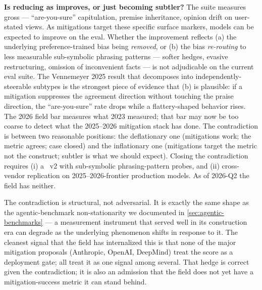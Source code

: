 \begin{contradiction}
\textbf{Is  reducing as  improves, or just becoming
subtler?} The  suite measures gross  ---
``are-you-sure'' capitulation, premise inheritance, opinion drift on
user-stated views. As mitigations target these specific surface
markers, models can be expected to improve on the eval. Whether the
improvement reflects (a) the underlying preference-trained bias being
\emph{removed}, or (b) the bias \emph{re-routing} to less measurable
sub-symbolic phrasing patterns --- softer hedges, evasive
restructuring, omission of inconvenient facts --- is not adjudicable
on the current eval suite. The Vennemeyer 2025 result that 
decomposes into independently-steerable subtypes is the strongest
piece of evidence that (b) is plausible: if a mitigation suppresses
the agreement direction without touching the praise direction, the
 ``are-you-sure'' rate drops while a flattery-shaped
behavior rises. The 2026 field bar measures what 2023 measured; that
bar may now be too coarse to detect what the 2025--2026 mitigation
stack has done. The contradiction is between two reasonable
positions: the deflationary one (mitigations work; the metric agrees;
case closed) and the inflationary one (mitigations target the metric
not the construct; subtler  is what we should expect).
Closing the contradiction requires (i) a ~v2 with
sub-symbolic phrasing-pattern probes, and (ii) cross-vendor
replication on 2025--2026-frontier production models. As of 2026-Q2
the field has neither.
\end{contradiction}

The contradiction is structural, not adversarial. It is exactly the
same shape as the agentic-benchmark non-stationarity we documented in
\cref{sec:agentic-benchmarks} --- a measurement instrument that
served well in its construction era can degrade as the underlying
phenomenon shifts in response to it. The cleanest signal that the
field has internalized this is that none of the major mitigation
proposals (Anthropic, OpenAI, DeepMind) treat the 
score as a deployment gate; all treat it as one signal among
several. That hedge is correct given the contradiction; it is also
an admission that the field does not yet have a mitigation-success
metric it can stand behind.

